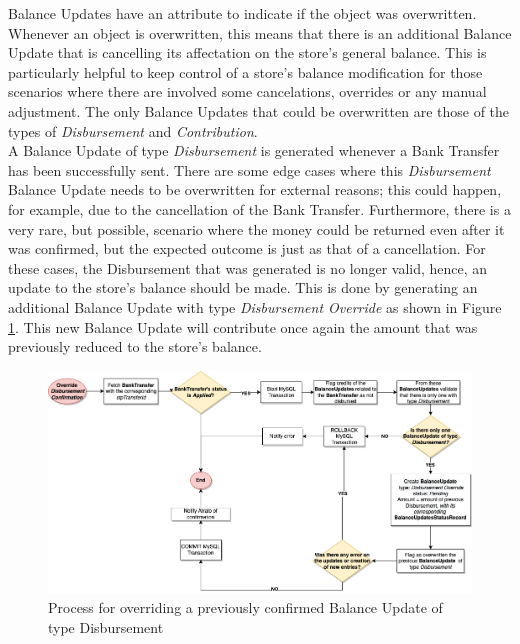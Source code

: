 Balance Updates have an attribute to indicate if the object was overwritten. Whenever an object is overwritten, this means that there is an additional Balance Update that is cancelling its affectation on the store’s general balance. This is particularly helpful to keep control of a store’s balance modification for those scenarios where there are involved some cancelations, overrides or any manual adjustment. The only Balance Updates that could be overwritten are those of the types of \textit{Disbursement} and \textit{Contribution}.\\

A Balance Update of type \textit{Disbursement} is generated whenever a Bank Transfer has been successfully sent. There are some edge cases where this \textit{Disbursement} Balance Update needs to be overwritten for external reasons; this could happen, for example, due to the cancellation of the Bank Transfer. Furthermore, there is a very rare, but possible, scenario where the money could be returned even after it was confirmed, but the expected outcome is just as that of a cancellation. For these cases, the Disbursement that was generated is no longer valid, hence, an update to the store’s balance should be made. This is done by generating an additional Balance Update with type \textit{Disbursement Override} as shown in Figure \ref{fig:override_disbursement}. This new Balance Update will contribute once again the amount that was previously reduced to the store’s balance.\\

\begin{figure} [H]
    \centering
    \includegraphics[scale = 0.4]{assets/diagrams/DisbursementOverride.png}
    \caption{Process for overriding a previously confirmed Balance Update of type Disbursement}\label{fig:override_disbursement}
\end{figure}


